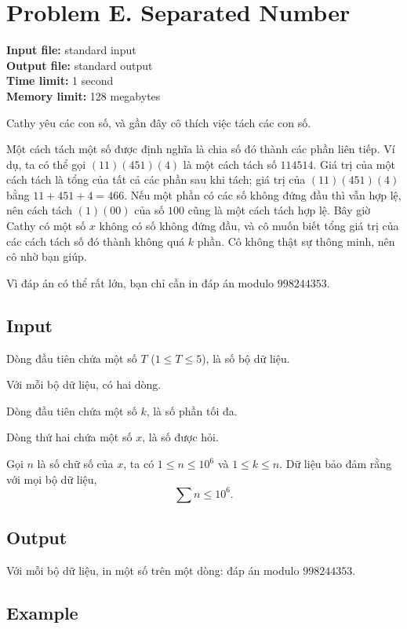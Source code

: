 \documentclass[11pt]{article}
\begin{document}
\section{Problem E. Separated Number}

\noindent
\textbf{Input file:} standard input\\
\textbf{Output file:} standard output\\
\textbf{Time limit:} 1 second\\
\textbf{Memory limit:} 128 megabytes

Cathy yêu các con số, và gần đây cô thích việc tách các con số.

Một cách tách một số được định nghĩa là chia số đó thành các phần liên tiếp.
Ví dụ, ta có thể gọi $(11)(451)(4)$ là một cách tách số $114514$. Giá trị của
một cách tách là tổng của tất cả các phần sau khi tách; giá trị của
$(11)(451)(4)$ bằng $11+451+4=466$. Nếu một phần có các số không đứng đầu thì
vẫn hợp lệ, nên cách tách $(1)(00)$ của số $100$ cũng là một cách tách hợp lệ.
Bây giờ Cathy có một số $x$ không có số không đứng đầu, và cô muốn biết tổng
giá trị của các cách tách số đó thành không quá $k$ phần. Cô không thật sự
thông minh, nên cô nhờ bạn giúp.

Vì đáp án có thể rất lớn, bạn chỉ cần in đáp án modulo $998244353$.

\subsection*{Input}

Dòng đầu tiên chứa một số $T$ ($1\le T\le 5$), là số bộ dữ liệu.

Với mỗi bộ dữ liệu, có hai dòng.

Dòng đầu tiên chứa một số $k$, là số phần tối đa.

Dòng thứ hai chứa một số $x$, là số được hỏi.

Gọi $n$ là số chữ số của $x$, ta có $1\le n\le 10^6$ và $1\le k\le n$.
Dữ liệu bảo đảm rằng với mọi bộ dữ liệu,
\[
  \sum n\le 10^6.
\]

\subsection*{Output}

Với mỗi bộ dữ liệu, in một số trên một dòng: đáp án modulo $998244353$.

\subsection*{Example}
\end{document}
